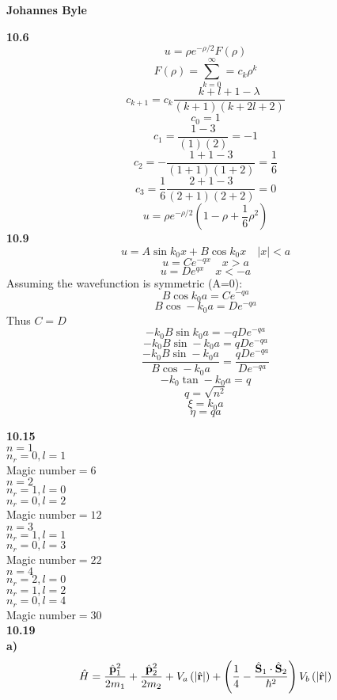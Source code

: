 \documentclass[english]{article}
\begin{document}
\textbf{Johannes Byle}\\
\begin{multicols}{2}
\noindent
\textbf{10.6}
$$u=\rho e^{-\rho/2}F(\rho)$$
$$F(\rho)=\sum_{k=0}^{\infty}=c_k\rho^k$$
$$c_{k+1}=c_k\frac{k+l+1-\lambda}{(k+1)(k+2l+2)}$$
$$c_0=1$$
$$c_{1}=\frac{1-3}{(1)(2)}=-1$$
$$c_{2}=-\frac{1+1-3}{(1+1)(1+2)}=\frac{1}{6}$$
$$c_{3}=\frac{1}{6}\frac{2+1-3}{(2+1)(2+2)}=0$$
$$u=\rho e^{-\rho/2}\left(1-\rho+\frac{1}{6}\rho^2\right)$$
\noindent
\textbf{10.9}
$$u=A\sin k_0x+B\cos k_0x\quad|x|<a$$
$$u=Ce^{-qx}\quad x>a$$
$$u=De^{qx}\quad x<-a$$
Assuming the wavefunction is symmetric (A=0):
$$B\cos k_0a=Ce^{-qa}$$
$$B\cos -k_0a=De^{-qa}$$
Thus $C=D$
$$-k_0B\sin k_0a=-qDe^{-qa}$$
$$-k_0B\sin -k_0a=qDe^{-qa}$$
$$\frac{-k_0B\sin -k_0a}{B\cos -k_0a}=\frac{qDe^{-qa}}{De^{-qa}}$$
$$-k_0\tan-k_0a=q$$
$$q=\sqrt{n^2}$$
$$\xi=k_0a$$
$$\eta=qa$$
\noindent
\textbf{10.15}\\
\textbf{$n=1$}\\
$n_r=0,l=1$\\
Magic number$=6$\\
\textbf{$n=2$}\\
$n_r=1,l=0$\\
$n_r=0,l=2$\\
Magic number$=12$\\
\textbf{$n=3$}\\
$n_r=1,l=1$\\
$n_r=0,l=3$\\
Magic number$=22$\\
\textbf{$n=4$}\\
$n_r=2,l=0$\\
$n_r=1,l=2$\\
$n_r=0,l=4$\\
Magic number$=30$\\
\noindent
\textbf{10.19}\\
\textbf{a)}
$$\hat{H}=\frac{\hat{\vb{p}}_1^2}{2m_1}+\frac{\hat{\vb{p}}_2^2}{2m_2}+V_a\left(|\hat{\vb{r}}|\right)+\left(\frac{1}{4}-\frac{\hat{\vb{S}}_1\cdot\hat{\vb{S}}_2}{\hbar^2}\right)V_b\left(|\hat{\vb{r}}|\right)$$

\end{multicols}
\end{document}
